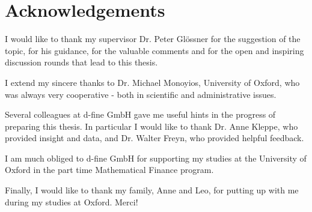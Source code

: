\chapter*{Acknowledgements} %
\label{cha:acknowledgements}


I would like to thank my supervisor Dr. Peter Gl\"ossner for the suggestion of the topic, for his guidance, for the valuable comments and for the open and inspiring discussion rounds that lead to this thesis.

I extend my sincere thanks to Dr. Michael Monoyios, University of Oxford, who was always very cooperative - both in scientific and administrative issues.

Several colleagues at d-fine GmbH gave me useful hints in the progress of preparing this thesis.
In particular I would like to thank Dr. Anne Kleppe, who provided insight and data, and Dr. Walter Freyn, who provided helpful feedback.

I am much obliged to d-fine GmbH for supporting my studies at the University of Oxford in the part time Mathematical Finance program.

Finally, I would like to thank my family, Anne and Leo, for putting up with me during my studies at Oxford. Merci!


